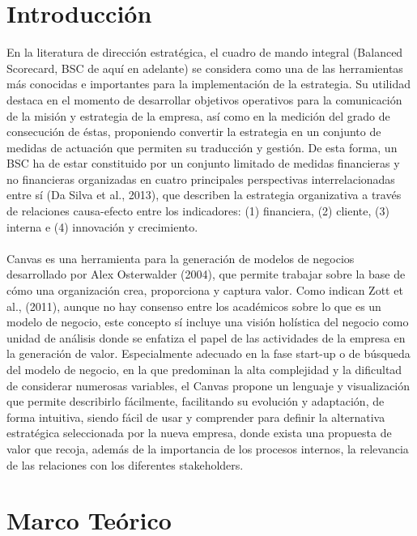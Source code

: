 \documentclass[preprint,12pt]{elsarticle}
\begin{document}
\section{Introducción}
En la literatura de dirección estratégica, el cuadro de mando integral (Balanced Scorecard, BSC de aquí en adelante) se considera como una de las herramientas más conocidas e importantes para la implementación de la estrategia. Su utilidad destaca en el momento de desarrollar objetivos operativos para la comunicación de la misión y estrategia de la empresa, así como en la medición del grado de consecución de éstas, proponiendo convertir la estrategia en un conjunto de medidas de actuación que permiten su traducción y gestión. De esta forma, un BSC ha de estar constituido por un conjunto limitado de medidas financieras y no financieras organizadas en cuatro principales perspectivas interrelacionadas entre sí (Da Silva et al., 2013), que describen la estrategia organizativa a través de relaciones causa-efecto entre los indicadores: (1) financiera, (2) cliente, (3) interna e (4) innovación y crecimiento.\\ \\
Canvas es una herramienta para la generación de modelos de negocios desarrollado por Alex Osterwalder (2004), que permite trabajar sobre la base de cómo una organización crea, proporciona y captura valor. Como indican Zott et al., (2011), aunque no hay consenso entre los académicos sobre lo que es un modelo de negocio, este concepto sí incluye una visión holística del negocio como unidad de análisis donde se enfatiza el papel de las actividades de la empresa en la generación de valor. Especialmente adecuado en la fase start-up o de búsqueda del modelo de negocio, en la que predominan la alta complejidad y la dificultad de considerar numerosas variables, el Canvas propone un lenguaje y visualización que permite describirlo fácilmente, facilitando su evolución y adaptación, de forma intuitiva, siendo fácil de usar y comprender para definir la alternativa estratégica seleccionada por la nueva empresa, donde exista una propuesta de valor que recoja, además de la importancia de los procesos internos, la relevancia de las relaciones con los diferentes stakeholders.





\section{Marco Teórico}
\end{document}
